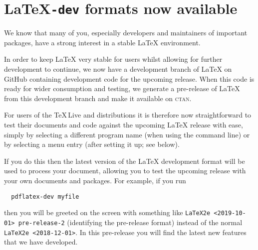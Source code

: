 \documentclass{ltnews}
\providecommand\MiKTeX{\hologo{MiKTeX}}
\providecommand\CTAN{\textsc{ctan}}
\providecommand\TL{\TeX\,Live}
\begin{document}

\maketitle
\tableofcontents

\setlength{}


\medskip





\section{\LaTeX\texttt{-dev} formats now available}


We know that many of you, especially developers and maintainers of
important packages, have a strong interest in a stable \LaTeX{}
environment.

In order to keep \LaTeX{} very stable for users whilst allowing for
further development to continue, we now have a development branch of
\LaTeX{} on GitHub containing development code for the upcoming
release. When this code is ready for wider consumption and testing, we
generate a pre-release of \LaTeX{} from this development branch and make
it available on \CTAN.

For users of the \TL{} and \MiKTeX{} distributions it is therefore now
straightforward to test their documents and code against the upcoming
\LaTeX{} release with ease, simply by selecting a different program name
(when using the command line) or by selecting a menu entry (after
setting it up; see below).

If you do this then the latest version of the \LaTeX{} development format
will be used to process your document, allowing you to test the
upcoming release with your own documents and packages. For example, if
you run
\begin{verbatim}
  pdflatex-dev myfile
\end{verbatim}
then you will be greeted on the screen with something like \texttt{LaTeX2e
  <2019-10-01> pre-release-2} (identifying the pre-release format)
instead of the normal \texttt{LaTeX2e <2018-12-01>}. In this
pre-release you will find the latest new features that we have
developed. 
\end{document}
